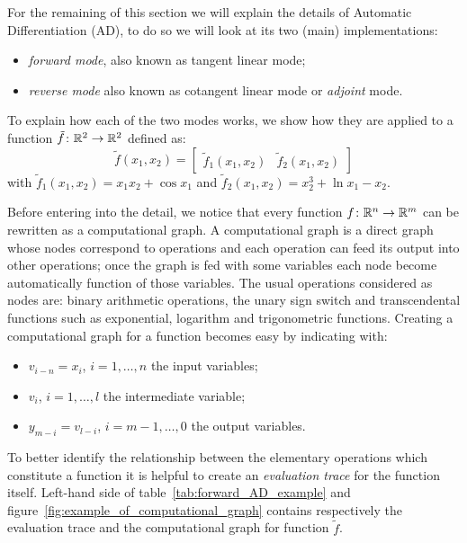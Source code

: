 For the remaining of this section we will explain the details of Automatic Differentiation (AD), to do so we will look at its two (main) implementations:
\begin{itemize}
	\item \emph{forward mode}, also known as tangent linear mode;
	\item \emph{reverse mode} also known as cotangent linear mode or \emph{adjoint} mode.
\end{itemize}
To explain how each of the two modes works, we show how they are applied to a function $\tilde{f} \colon \mathbb{R}^2 \to \mathbb{R}^2$ defined as:
\begin{equation}
	\label{eqn:example_function_for_AD}
	\tilde{f}(x_1, x_2) = \begin{bmatrix}
					\tilde{f}_1(x_1, x_2)  &  \tilde{f}_2(x_1, x_2)
				  \end{bmatrix}
\end{equation}
with $\tilde{f}_1(x_1, x_2) = x_1 x_2 + \cos x_1$ and $\tilde{f}_2(x_1, x_2) = x_2^3 + \ln x_1 - x_2$.

\smallskip
Before entering into the detail, we notice that every function $f \colon \mathbb{R}^n \to \mathbb{R}^m$ can be rewritten as a computational graph. A computational graph is a direct graph whose nodes correspond to operations and each operation can feed its output into other operations; once the graph is fed with some variables each node become automatically function of those variables. The usual operations considered as nodes are: binary arithmetic operations, the unary sign switch and transcendental functions such as exponential, logarithm and trigonometric functions.
Creating a computational graph for a function becomes easy by indicating with:
\begin{itemize}
	\item $v_{i-n}=x_i$, $i=1, \dots, n$ the input variables;
	\item $v_i$, $i=1, \dots, l$ the intermediate variable;
	\item $y_{m-i}=v_{l-i}$, $i=m-1, \dots, 0$ the output variables.
\end{itemize}
To better identify the relationship between the elementary operations which constitute a function it is helpful to create an \emph{evaluation trace} for the function itself.
Left-hand side of table~\ref{tab:forward_AD_example} and figure~\ref{fig:example_of_computational_graph} contains respectively the evaluation trace and the computational graph for function $\tilde{f}$.

